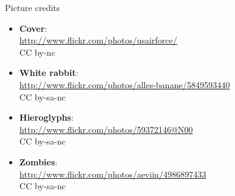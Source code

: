 \begin{frame}[plain]{Picture credits}
  \scriptsize
  \begin{itemize}
    \item \textbf{Cover}:\\ \url{http://www.flickr.com/photos/usairforce/}\\ CC by-nc
    \item \textbf{White rabbit}:\\ \url{http://www.flickr.com/photos/alles-banane/5849593440}\\ CC by-sa-nc
    \item \textbf{Hieroglyphs}:\\ \url{http://www.flickr.com/photos/59372146@N00}\\ CC by-sa-nc
    \item \textbf{Zombies}:\\ \url{http://www.flickr.com/photos/aeviin/4986897433}\\ CC by-sa-nc
  \end{itemize}
\end{frame}
